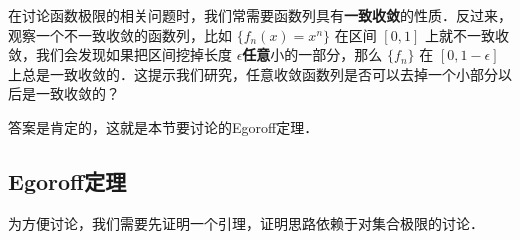 

在讨论函数极限的相关问题时，我们常需要函数列具有\textbf{一致收敛}的性质．反过来，观察一个不一致收敛的函数列，比如 $\{f_n(x)=x^n\}$ 在区间 $[0, 1]$ 上就不一致收敛，我们会发现如果把区间挖掉长度 $\epsilon$\textbf{任意}小的一部分，那么 $\{f_n\}$ 在 $[0, 1-\epsilon]$ 上总是一致收敛的．这提示我们研究，任意收敛函数列是否可以去掉一个小部分以后是一致收敛的？

答案是肯定的，这就是本节要讨论的Egoroff定理．

\subsection{Egoroff定理}

为方便讨论，我们需要先证明一个引理，证明思路依赖于对集合极限的讨论．










